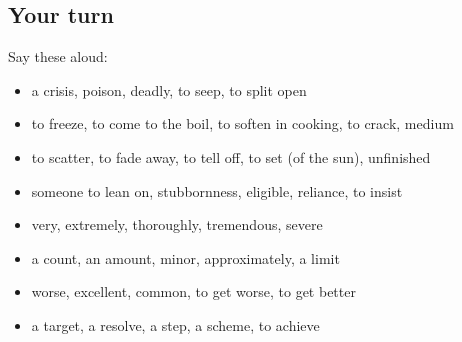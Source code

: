 \subsection*{Your turn}
Say these aloud:

\begin{itemize}
\raggedright
  \item a crisis, poison, deadly, to seep, to split open
  \item to freeze, to come to the boil, to soften in cooking, to crack, medium
  \item to scatter, to fade away, to tell off, to set (of the sun), unfinished
  \item someone to lean on, stubbornness, eligible, reliance, to insist
  \item very, extremely, thoroughly, tremendous, severe
  \item a count, an amount, minor, approximately, a limit
  \item worse, excellent, common, to get worse, to get better
  \item a target, a resolve, a step, a scheme, to achieve
\end{itemize}

